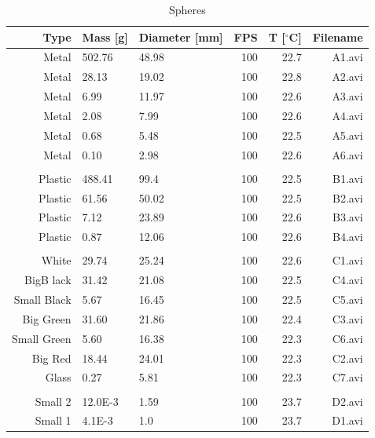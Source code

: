 \documentclass[11pt,a4paper]{article}
\begin{document}
  \begin{table}[H]
    \center
    \begin{tabular}{ r | l  l  r  r  r }
      
      Type       & Mass [g] & Diameter [mm]   & FPS    & T [$^\circ$C]   & Filename \\ 
      \hline
      Metal       & 502.76  & 48.98          & 100    & 22.7   & A1.avi  \\ 
      Metal       & 28.13   & 19.02          & 100    & 22.8   & A2.avi  \\  
      Metal       & 6.99    & 11.97          & 100    & 22.6   & A3.avi  \\ 
      Metal       & 2.08    & 7.99           & 100    & 22.6   & A4.avi  \\ 
      Metal       & 0.68    & 5.48           & 100    & 22.5   & A5.avi  \\ 
      Metal       & 0.10    & 2.98           & 100    & 22.6   & A6.avi  \\ 
      \\
      Plastic     & 488.41  & 99.4           & 100    & 22.5   & B1.avi  \\ 
      Plastic     & 61.56   & 50.02          & 100    & 22.5   & B2.avi  \\ 
      Plastic     & 7.12    & 23.89          & 100    & 22.6   & B3.avi  \\ 
      Plastic     & 0.87    & 12.06          & 100    & 22.6   & B4.avi  \\ 
      \\
      White       & 29.74   & 25.24          & 100    & 22.6   & C1.avi  \\ 
      BigB lack   & 31.42   & 21.08          & 100    & 22.5   & C4.avi  \\ 
      Small Black & 5.67    & 16.45          & 100    & 22.5   & C5.avi  \\ 
      Big Green   & 31.60   & 21.86          & 100    & 22.4   & C3.avi  \\ 
      Small Green & 5.60    & 16.38          & 100    & 22.3   & C6.avi  \\ 
      Big Red     & 18.44   & 24.01          & 100    & 22.3   & C2.avi  \\ 
      Glass       & 0.27    & 5.81           & 100    & 22.3   & C7.avi  \\ 
      \\
      Small 2     & 12.0E-3 & 1.59           & 100    & 23.7   & D2.avi  \\    
      Small 1     & 4.1E-3  & 1.0            & 100    & 23.7   & D1.avi  \\ 
    \end{tabular}
    \caption{Spheres}
  \end{table}
\end{document}
